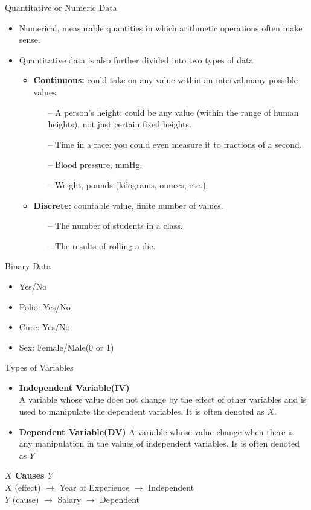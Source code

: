 \documentclass[10pt,dvipsnames, aspectratio=169]{beamer}
\begin{document}
\begin{frame}[t]{Quantitative or Numeric Data}
	\begin{itemize}
		\item Numerical, measurable quantities in which arithmetic
		operations often make sense.
		\item Quantitative data is also further divided into two types of data
		\begin{itemize}
			\item \textbf{Continuous:} could take on any value within an 
			interval,many possible values.
			\begin{itemize}
				\item[--] A person's height: could be any value (within the 
				range 
				of human heights), not just certain fixed heights. 
				\item[--] Time in a race: you could even measure it to 
				fractions of 
				a second.
				\item [--]Blood pressure, mmHg.
				\item [--]Weight, pounds (kilograms, ounces, etc.)
			\end{itemize}
			\item \textbf{Discrete:} countable value, finite number of values.
			\begin{itemize}
				\item[--] The number of students in a class.
				\item[--] The results of rolling a die.
			\end{itemize}
		\end{itemize}
	\end{itemize}
\end{frame}

\begin{frame}[t]{Binary Data}
	\begin{itemize}
		\item Yes/No
		\item Polio: Yes/No
		\item Cure: Yes/No
		\item Sex: Female/Male(0 or 1)
	\end{itemize}
\end{frame}

\begin{frame}[t]{Types of Variables}
	\begin{itemize}
		\item \textbf{Independent Variable(IV)} \\
		A variable whose value does not change by the effect of other variables 
		and is used to manipulate the dependent variables. It is often denoted 
		as $X$. 
		\item \textbf{Dependent Variable(DV)} 
		A variable whose value change when there is any manipulation in the 
		values of independent variables. Is is often denoted as $Y$
	\end{itemize}
	\centering
	\textbf{$X$ Causes $Y$} \\ 
	$X$ (effect) $\rightarrow$ Year of Experience $\rightarrow$ Independent \\ 
	$Y$ (cause) $\rightarrow$ Salary $\rightarrow$ Dependent
\end{frame}
\end{document}
